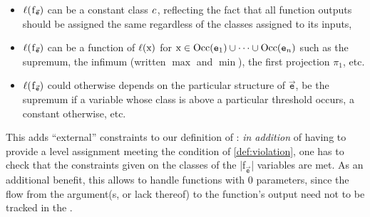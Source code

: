 \begin{itemize}
\item \ensuremath{\ell(\prc|f$_{\vec{\mathtt{e}}}$|)}
can be a constant class \(\mathit{c}\), reflecting the fact that all
function outputs should be assigned the same  regardless of
the classes assigned to its inputs,

\item \ensuremath{\ell(\prc|f$_{\vec{\mathtt{e}}}$|)}
can be a function of \(\lvl{\prc|x|}\) for \(\prc|x| \in
\Occ(\mathtt{e}_1) \cup \cdots \cup \Occ(\mathtt{e}_n)\)
such as the supremum, the infimum (written \(\max\) and \(\min\)), the first
projection \(\pi_1\), etc.

\item \ensuremath{\ell(\prc|f$_{\vec{\mathtt{e}}}$|)}
could otherwise depends on the particular structure of \(\vec{\mathtt{e}}\), \eg
be the supremum if a variable whose class is above a particular threshold
occurs, a constant otherwise, etc.
\end{itemize}

This adds \enquote{external} constraints to our definition of :
\emph{in addition} of having to provide a level assignment meeting the condition
of \autoref{def:violation}, one has to check that the constraints given
on the classes of the \prc|f$_{\vec{\mathtt{e}}}$| variables are met.
As an additional benefit, this allows to handle functions with \(0\) parameters,
since the flow from the argument(s, or lack thereof) to the function's output
need not to be tracked in the .


